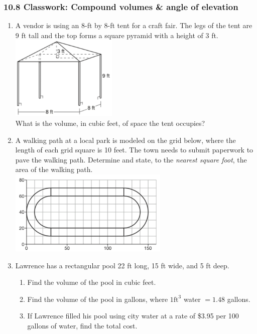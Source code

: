 \documentclass[12pt, twoside]{article}
\begin{document}
\subsubsection*{10.8 Classwork: Compound volumes \& angle of elevation}
 \begin{enumerate}

  \item A vendor is using an 8-ft by 8-ft tent for a craft fair. The legs of the tent are 9 ft tall and the top forms a square pyramid with a height of 3 ft.\\[1cm]
    \includegraphics[width=0.4\textwidth]{tent_Jan2019-9.png}\\[0.5cm]
    What is the volume, in cubic feet, of space the tent occupies? \vspace{3cm}

  \item A walking path at a local park is modeled on the grid below, where the length of each grid square is 10 feet. The town needs to submit paperwork to pave the walking path. Determine and state, to the \emph{nearest square foot}, the area of the walking path.\\[0.3cm]
    \includegraphics[width=0.6\textwidth]{path_Jan2019-31.png} \vspace{3cm}

  \item Lawrence has a rectangular pool 22 ft long, 15 ft wide, and 5 ft deep.
    \begin{enumerate}
      \item Find the volume of the pool in cubic feet. \vspace{3cm}
      \item Find the volume of the pool in gallons, where $1 \mathrm{ ft}^3$ water $= 1.48$ gallons. \vspace{3cm}
      \item If Lawrence filled his pool using city water at a rate of \$3.95 per 100 gallons of water, find the total cost.
    \end{enumerate} \vspace{3cm}


\end{enumerate}
\end{document}
